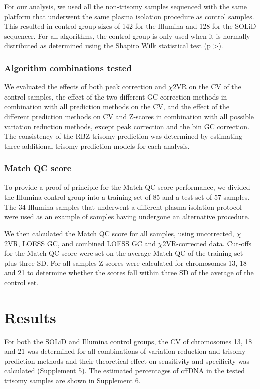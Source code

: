 For our analysis, we used all the non-trisomy samples sequenced with the same platform that underwent the same plasma isolation procedure as control samples. 
This resulted in control group sizes of 142 for the Illumina and 128 for the SOLiD sequencer. 
For all algorithms, the control group is only used when it is normally distributed as determined using the Shapiro Wilk statistical test (p \textgreater{}).

\subsubsection{Algorithm combinations tested}
We evaluated the effects of both peak correction and $\chi$2VR on the CV of the control samples, the effect of the two different GC correction methods in combination with all prediction methods on the CV, and the effect of the different prediction methods on CV and Z-scores in combination with all possible variation reduction methods, except peak correction and the bin GC correction. 
The consistency of the RBZ trisomy prediction was determined by estimating three additional trisomy prediction models for each analysis.

\subsubsection{Match QC score}
To provide a proof of principle for the Match QC score performance, we divided the Illumina control group into a training set of 85 and a test set of 57 samples. 
The 34 Illumina samples that underwent a different plasma isolation protocol were used as an example of samples having undergone an alternative procedure.

We then calculated the Match QC score for all samples, using uncorrected, $\chi$2VR, LOESS GC, and combined LOESS GC and $\chi$2VR-corrected data. 
Cut-offs for the Match QC score were set on the average Match QC of the training set plus three SD. 
For all samples Z-scores were calculated for chromosomes 13, 18 and 21 to determine whether the scores fall within three SD of the average of the control set.

\section{Results}\label{Results}
For both the SOLiD and Illumina control groups, the CV of chromosomes 13, 18 and 21 was determined for all combinations of variation reduction and trisomy prediction methods and their theoretical effect on sensitivity and specificity was calculated (Supplement 5). 
The estimated percentages of cffDNA in the tested trisomy samples are shown in Supplement 6.

